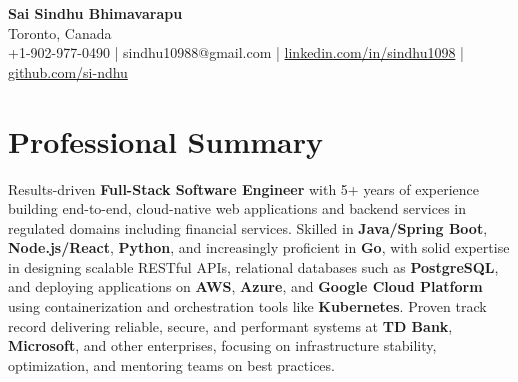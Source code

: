 \documentclass[letterpaper,11pt]{article}
\begin{document}
\begin{center}
  {\Large \textbf{Sai Sindhu Bhimavarapu}} \\
  Toronto, Canada \\
  +1-902-977-0490 \enspace | \enspace sindhu10988@gmail.com \enspace | \enspace \href{https://www.linkedin.com/in/sindhu1098/}{linkedin.com/in/sindhu1098} \enspace | \enspace \href{https://github.com/si-ndhu}{github.com/si-ndhu}
\end{center}

\section{Professional Summary}
  \begin{itemize}[leftmargin=0.15in, label={}]
    \small{\item{
     Results-driven \textbf{Full-Stack Software Engineer} with 5+ years of experience building end-to-end, cloud-native web applications and backend services in regulated domains including financial services. Skilled in \textbf{Java/Spring Boot}, \textbf{Node.js/React}, \textbf{Python}, and increasingly proficient in \textbf{Go}, with solid expertise in designing scalable RESTful APIs, relational databases such as \textbf{PostgreSQL}, and deploying applications on \textbf{AWS}, \textbf{Azure}, and \textbf{Google Cloud Platform} using containerization and orchestration tools like \textbf{Kubernetes}. Proven track record delivering reliable, secure, and performant systems at \textbf{TD Bank}, \textbf{Microsoft}, and other enterprises, focusing on infrastructure stability, optimization, and mentoring teams on best practices.
    }}
  \end{itemize}
\vspace{-16pt}

\end{document}
